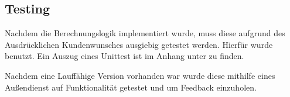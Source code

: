 \subsection{Testing}

Nachdem die Berechnungslogik implementiert wurde, muss diese aufgrund des Ausdrücklichen Kundenwunsches ausgiebig getestet werden. Hierfür wurde  benutzt. Ein Auszug eines Unittest ist im Anhang unter  zu finden.

Nachdem eine Lauffähige Version vorhanden war wurde diese mithilfe eines Außendienst  auf Funktionalität getestet und um Feedback einzuholen.